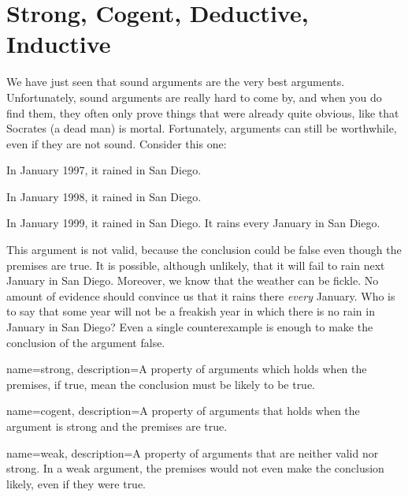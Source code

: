 

\section{Strong, Cogent, Deductive, Inductive}

We have just seen that sound arguments are the very best arguments. Unfortunately, sound arguments are really hard to come by, and when you do find them, they often only prove things that were already quite obvious, like that Socrates (a dead man) is mortal. Fortunately, arguments can still be worthwhile, even if they are not sound. Consider this one:

\begin{earg*}
\item In January 1997, it rained in San Diego.
\item In January 1998, it rained in San Diego.
\item In January 1999, it rained in San Diego.
\itemc[.6] It rains every January in San Diego.
\end{earg*}


This argument is not valid, because the conclusion could be false even though the premises are true. It is possible, although unlikely, that it will fail to rain next January in San Diego. Moreover, we know that the weather can be fickle. No amount of evidence should convince us that it rains there \emph{every} January. Who is to say that some year will not be a freakish year in which there is no rain in January in San Diego? Even a single counterexample is enough to make the conclusion of the argument false.

{
name=strong,
description={A property of arguments which holds when the premises, if true, mean the conclusion must be likely to be true.}
}


{
name=cogent,
description={A property of arguments that holds when the argument is strong and the premises are true.}
}



{
name=weak,
description={A property of arguments that are neither valid nor strong. In a weak argument, the premises would not even make the conclusion likely, even if they were true.}
}



